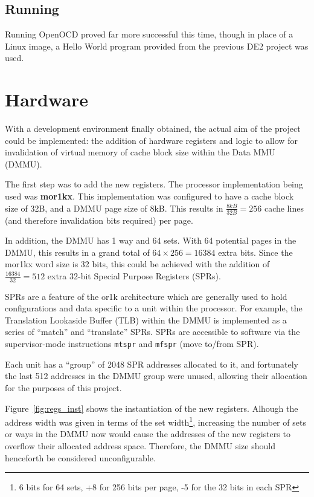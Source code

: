 \subsection{Running}
Running OpenOCD proved far more successful this time, though in place of a Linux image, a Hello World program provided from the previous DE2 project was used.

\section{Hardware}
\label{sec:har}
With a development environment finally obtained, the actual aim of the project could be implemented: the addition of hardware registers and logic to allow for invalidation of virtual memory of cache block size within the Data MMU (DMMU).

The first step was to add the new registers. The processor implementation being used was \textbf{mor1kx}\cite{mor1kx}. This implementation was configured to have a cache block size of 32B, and a DMMU page size of 8kB. This results in $\frac{8kB}{32B} = 256$ cache lines (and therefore invalidation bits required) per page.

In addition, the DMMU has 1 way and 64 sets. With 64 potential pages in the DMMU, this results in a grand total of $64 \times 256 = 16384$ extra bits. Since the mor1kx word size is 32 bits, this could be achieved with the addition of $\frac{16384}{32} = 512$ extra 32-bit Special Purpose Registers (SPRs).

SPRs are a feature of the or1k architecture which are generally used to hold configurations and data specific to a unit within the processor. For example, the Translation Lookaside Buffer (TLB) within the DMMU is implemented as a series of ``match'' and ``translate'' SPRs. SPRs are accessible to software via the supervisor-mode instructions \texttt{mtspr} and \texttt{mfspr} (move to\slash from SPR).

Each unit has a ``group'' of 2048 SPR addresses allocated to it, and fortunately the last 512 addresses in the DMMU group were unused, allowing their allocation for the purposes of this project.

Figure~\ref{fig:regs_inst} shows the instantiation of the new registers. Alhough the address width was given in terms of the set width\footnote{6 bits for 64 sets, +8 for 256 bits per page, -5 for the 32 bits in each SPR}, increasing the number of sets or ways in the DMMU now would cause the addresses of the new registers to overflow their allocated address space. Therefore, the DMMU size should henceforth be considered unconfigurable.


